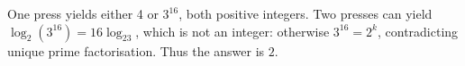 One press yields either 4 or $3^{16}$, both positive integers. Two presses can yield $\log_2(3^{16})=16\log_23$, which is not an integer: otherwise $3^{16}=2^k$, contradicting unique prime factorisation. Thus the answer is $\boxed2$.
